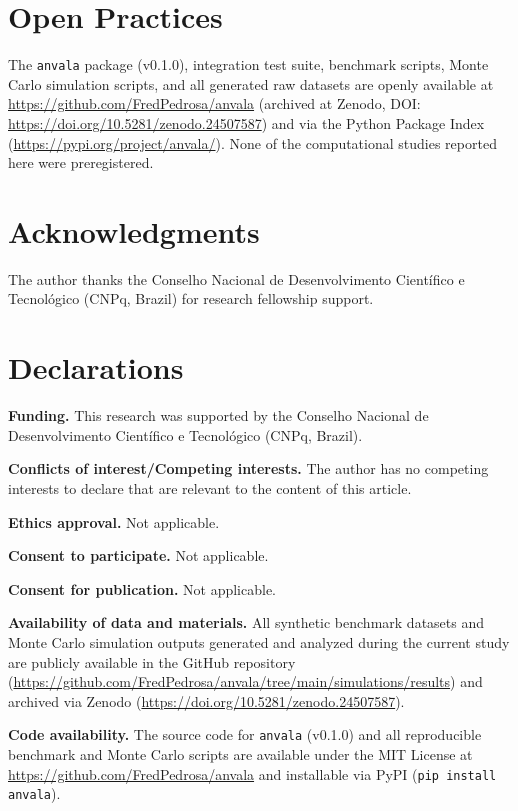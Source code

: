 ﻿\documentclass[12pt,letterpaper]{article}
\begin{document}
\section*{Open Practices}
The \texttt{anvala} package (v0.1.0), integration test suite, benchmark scripts, Monte Carlo simulation scripts, and all generated raw datasets are openly available at \url{https://github.com/FredPedrosa/anvala} (archived at Zenodo, DOI: \url{https://doi.org/10.5281/zenodo.24507587}) and via the Python Package Index (\url{https://pypi.org/project/anvala/}). None of the computational studies reported here were preregistered.

\section*{Acknowledgments}
The author thanks the Conselho Nacional de Desenvolvimento Científico e Tecnológico (CNPq, Brazil) for research fellowship support.

\section*{Declarations}

\noindent \textbf{Funding.} This research was supported by the Conselho Nacional de Desenvolvimento Científico e Tecnológico (CNPq, Brazil).

\noindent \textbf{Conflicts of interest/Competing interests.} The author has no competing interests to declare that are relevant to the content of this article.

\noindent \textbf{Ethics approval.} Not applicable.

\noindent \textbf{Consent to participate.} Not applicable.

\noindent \textbf{Consent for publication.} Not applicable.

\noindent \textbf{Availability of data and materials.} All synthetic benchmark datasets and Monte Carlo simulation outputs generated and analyzed during the current study are publicly available in the GitHub repository (\url{https://github.com/FredPedrosa/anvala/tree/main/simulations/results}) and archived via Zenodo (\url{https://doi.org/10.5281/zenodo.24507587}).

\noindent \textbf{Code availability.} The source code for \texttt{anvala} (v0.1.0) and all reproducible benchmark and Monte Carlo scripts are available under the MIT License at \url{https://github.com/FredPedrosa/anvala} and installable via PyPI (\texttt{pip install anvala}).
\end{document}

